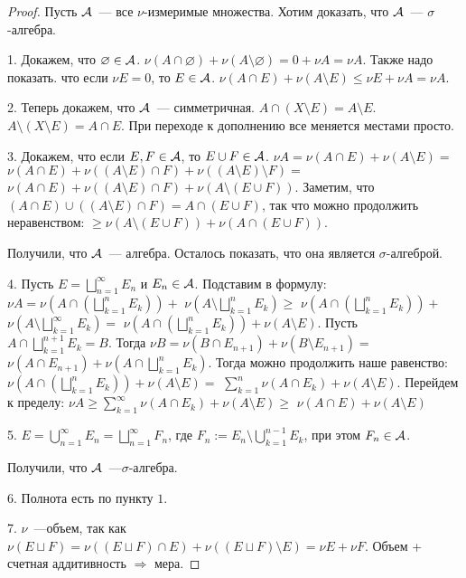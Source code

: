 \begin{proof}
    Пусть $\mathcal{A}$~--- все $\nu$-измеримые множества. Хотим доказать, что $\mathcal{A}$~--- $\sigma$-алгебра.

    1. Докажем, что $\varnothing \in \mathcal{A}$. $\nu (A \cap \varnothing) + \nu (A \setminus \varnothing) = 0 + \nu A = \nu A$. 
    Также надо показать. что если $\nu E = 0$, то $E \in \mathcal{A}$. $\nu (A \cap E) + \nu (A \setminus E) \le \nu E + \nu A = \nu A$.

    2. Теперь докажем, что $\mathcal{A}$~--- симметричная. $A \cap (X \setminus E) = A \setminus E$. $A \setminus (X \setminus E) = A \cap E$.
    При переходе к дополнению все меняется местами просто.

    3. Докажем, что если $E, F \in \mathcal{A}$, то $E \cup F \in \mathcal{A}$. $\nu A = \nu (A \cap E) + \nu (A \setminus E) = $
    $\nu (A \cap E) + \nu ((A \setminus E) \cap F) + \nu ((A \setminus E) \setminus F) = $
    $\nu (A \cap E) + \nu ((A \setminus E) \cap F) + \nu (A \setminus (E \cup F))$. 
    Заметим, что $(A \cap E) \cup ((A \setminus E) \cap F) = A \cap (E \cup F)$, так что можно продолжить неравенством:
    $\ge \nu (A \setminus (E \cup F)) + \nu (A \cap (E \cup F))$.

    Получили, что $\mathcal{A}$~--- алгебра. Осталось показать, что она является $\sigma$-алгеброй.

    4. Пусть $E = \bigsqcup \limits_{n = 1}^{\infty} E_n$ и $E_n \in \mathcal{A}$. 
    Подставим в формулу: $\nu A = \nu (A \cap (\bigsqcup \limits_{k = 1}^{n} E_k)) + $
    $\nu (A \setminus \bigsqcup \limits_{k = 1}^{n} E_k) \ge $
    $ \nu (A \cap (\bigsqcup \limits_{k = 1}^{n} E_k)) + $
    $\nu (A \setminus \bigsqcup \limits_{k = 1}^{\infty} E_k) = $
    $ \nu (A \cap (\bigsqcup \limits_{k = 1}^{n} E_k)) + \nu (A \setminus E)$.
    Пусть $A \cap \bigsqcup \limits_{k = 1}^{n + 1} E_k = B$. 
    Тогда $\nu B = \nu (B \cap E_{n + 1}) + \nu (B \setminus E_{n + 1}) = $
    $\nu (A \cap E_{n + 1}) + \nu (A \cap \bigsqcup \limits_{k = 1}^{n} E_k)$.
    Тогда можно продолжить наше равенство: $ \nu (A \cap (\bigsqcup \limits_{k = 1}^{n} E_k)) + \nu (A \setminus E) = $
    $\sum \limits_{k=1}^{n} \nu (A \cap E_k) + \nu (A \setminus E)$. 
    Перейдем к пределу:
    $\nu A \ge \sum \limits_{k=1}^{\infty} \nu (A \cap E_k) + \nu (A \setminus E) \ge $
    $\nu (A \cap E) + \nu (A \setminus E)$

    5. $E = \bigcup \limits_{n = 1}^{\infty} E_n = \bigsqcup \limits_{n = 1}^{\infty} F_n$, где 
    $F_n := E_n \setminus \bigcup \limits_{k = 1}^{n - 1} E_k$, при этом $F_n \in \mathcal{A}$.

    Получили, что $\mathcal{A}$~---$\sigma$-алгебра.

    6. Полнота есть по пункту $1.$

    7. $\nu$~---объем, так как $\nu (E \sqcup F) = \nu ((E \sqcup F) \cap E) + \nu ((E \sqcup F) \setminus E) = \nu E + \nu F$. 
    Объем + счетная аддитивность $\Rightarrow$ мера.
\end{proof}